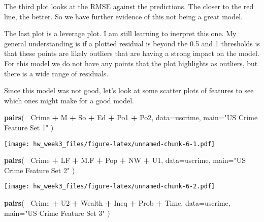 \documentclass[]{article}
\newenvironment{Shaded}{\begin{snugshade}}{\end{snugshade}}
\newcommand{\KeywordTok}[1]{\textcolor[rgb]{0.13,0.29,0.53}{\textbf{#1}}}
\newcommand{\DataTypeTok}[1]{\textcolor[rgb]{0.13,0.29,0.53}{#1}}
\newcommand{\StringTok}[1]{\textcolor[rgb]{0.31,0.60,0.02}{#1}}
\newcommand{\OperatorTok}[1]{\textcolor[rgb]{0.81,0.36,0.00}{\textbf{#1}}}
\newcommand{\NormalTok}[1]{#1}
\begin{document}
The third plot looks at the RMSE against the predictions. The closer to
the red line, the better. So we have further evidence of this not being
a great model.

The last plot is a leverage plot. I am still learning to inerpret this
one. My general understanding is if a plotted residual is beyond the 0.5
and 1 thresholds is that these points are likely outliers that are
having a strong impact on the model. For this model we do not have any
points that the plot highlights as outliers, but there is a wide range
of residuals.

Since this model was not good, let's look at some scatter plots of
features to see which ones might make for a good model.

\begin{Shaded}
\begin{Highlighting}[]
\KeywordTok{pairs}\NormalTok{(}
  \OperatorTok{~}\NormalTok{Crime }\OperatorTok{+}\StringTok{ }\NormalTok{M }\OperatorTok{+}\StringTok{ }\NormalTok{So }\OperatorTok{+}\StringTok{ }\NormalTok{Ed }\OperatorTok{+}\StringTok{ }\NormalTok{Po1 }\OperatorTok{+}\StringTok{ }\NormalTok{Po2, }
  \DataTypeTok{data=}\NormalTok{uscrime, }
  \DataTypeTok{main=}\StringTok{"US Crime Feature Set 1"}
\NormalTok{)}
\end{Highlighting}
\end{Shaded}

\texttt{[image: hw\_week3\_files/figure-latex/unnamed-chunk-6-1.pdf]}

\begin{Shaded}
\begin{Highlighting}[]
\KeywordTok{pairs}\NormalTok{(}
  \OperatorTok{~}\NormalTok{Crime }\OperatorTok{+}\StringTok{ }\NormalTok{LF }\OperatorTok{+}\StringTok{ }\NormalTok{M.F }\OperatorTok{+}\StringTok{ }\NormalTok{Pop }\OperatorTok{+}\StringTok{ }\NormalTok{NW }\OperatorTok{+}\StringTok{ }\NormalTok{U1, }
  \DataTypeTok{data=}\NormalTok{uscrime, }
  \DataTypeTok{main=}\StringTok{"US Crime Feature Set 2"}
\NormalTok{)}
\end{Highlighting}
\end{Shaded}

\texttt{[image: hw\_week3\_files/figure-latex/unnamed-chunk-6-2.pdf]}

\begin{Shaded}
\begin{Highlighting}[]
\KeywordTok{pairs}\NormalTok{(}
  \OperatorTok{~}\NormalTok{Crime }\OperatorTok{+}\StringTok{ }\NormalTok{U2 }\OperatorTok{+}\StringTok{ }\NormalTok{Wealth }\OperatorTok{+}\StringTok{ }\NormalTok{Ineq }\OperatorTok{+}\StringTok{ }\NormalTok{Prob }\OperatorTok{+}\StringTok{ }\NormalTok{Time, }
  \DataTypeTok{data=}\NormalTok{uscrime, }
  \DataTypeTok{main=}\StringTok{"US Crime Feature Set 3"}
\NormalTok{)}
\end{Highlighting}
\end{Shaded}
\end{document}

